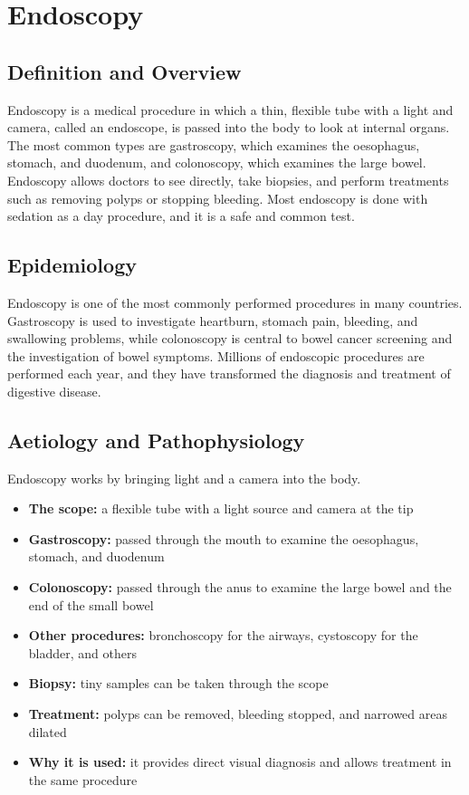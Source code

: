 \chapter{Endoscopy}

\section*{Definition and Overview}
Endoscopy is a medical procedure in which a thin, flexible tube with a light and camera, called an endoscope, is passed into the body to look at internal organs. The most common types are gastroscopy, which examines the oesophagus, stomach, and duodenum, and colonoscopy, which examines the large bowel. Endoscopy allows doctors to see directly, take biopsies, and perform treatments such as removing polyps or stopping bleeding. Most endoscopy is done with sedation as a day procedure, and it is a safe and common test.

\section*{Epidemiology}
Endoscopy is one of the most commonly performed procedures in many countries. Gastroscopy is used to investigate heartburn, stomach pain, bleeding, and swallowing problems, while colonoscopy is central to bowel cancer screening and the investigation of bowel symptoms. Millions of endoscopic procedures are performed each year, and they have transformed the diagnosis and treatment of digestive disease.

\section*{Aetiology and Pathophysiology}
Endoscopy works by bringing light and a camera into the body.
\begin{itemize}
    \item \textbf{The scope:} a flexible tube with a light source and camera at the tip
    \item \textbf{Gastroscopy:} passed through the mouth to examine the oesophagus, stomach, and duodenum
    \item \textbf{Colonoscopy:} passed through the anus to examine the large bowel and the end of the small bowel
    \item \textbf{Other procedures:} bronchoscopy for the airways, cystoscopy for the bladder, and others
    \item \textbf{Biopsy:} tiny samples can be taken through the scope
    \item \textbf{Treatment:} polyps can be removed, bleeding stopped, and narrowed areas dilated
    \item \textbf{Why it is used:} it provides direct visual diagnosis and allows treatment in the same procedure
\end{itemize}

